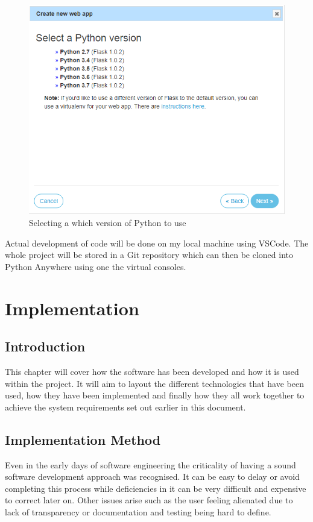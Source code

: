\documentclass[10pt,a4paper]{article}
\begin{document}
\begin{figure}[H]
\centering
  \includegraphics[width=\linewidth]{images/webapppython.png}
  \caption{Selecting a which version of Python to use}
  \label{fig:webapppython}
\end{figure}

Actual development of code will be done on my local machine using VSCode. The whole project will be stored in a Git repository which can then be cloned into Python Anywhere using one the virtual consoles. 

\pagebreak
\section{Implementation} 
\subsection{Introduction}
This chapter will cover how the software has been developed and how it is used within the project. It will aim to layout the different technologies that have been used, how they have been implemented and finally how they all work together to achieve the system requirements set out earlier in this document.

\subsection{Implementation Method}
Even in the early days of software engineering the criticality of having a sound software development approach was recognised. It can be easy to delay or avoid completing this process while deficiencies in it can be very difficult and expensive to correct later on. Other issues arise such as the user feeling alienated due to lack of transparency or documentation and testing being hard to define\cite{1674590}.
\end{document}
